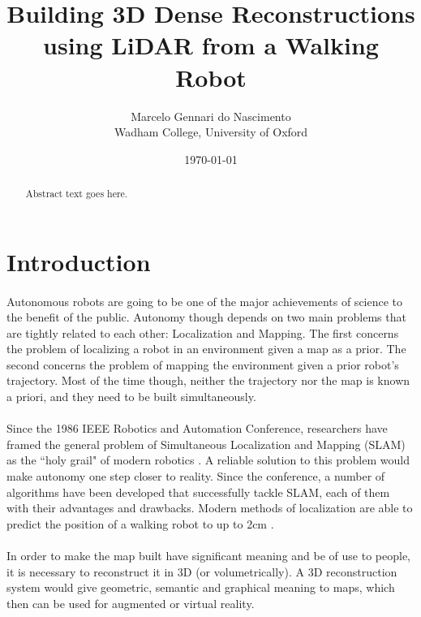 \documentclass[11pt]{article}
\title{Building 3D Dense Reconstructions using LiDAR from a Walking Robot}
\author{Marcelo Gennari do Nascimento \\ Wadham College, University of Oxford}
\date{\today}
\begin{document}

	\maketitle

	\newpage

	\begin{abstract}
		Abstract text goes here.
	\end{abstract}

	\newpage
	\tableofcontents

	\newpage
	\section{Introduction}
	\paragraph{}
	Autonomous robots are going to be one of the major achievements of science to the benefit of the public. Autonomy though depends on two main problems that are tightly related to each other: Localization and Mapping. The first concerns the problem of localizing a robot in an environment given a map as a prior. The second concerns the problem of mapping the environment given a prior robot's trajectory. Most of the time though, neither the trajectory nor the map is known a priori, and they need to be built simultaneously.
	
	\paragraph{}
	Since the 1986 IEEE Robotics and Automation Conference, researchers have framed the general problem of Simultaneous Localization and Mapping (SLAM) as the ``holy grail" of modern robotics \cite{SLAMPartI}. A reliable solution to this problem would make autonomy one step closer to reality. Since the conference, a number of algorithms have been developed that successfully tackle SLAM, each of them with their advantages and drawbacks. Modern methods of localization are able to predict the position of a walking robot to up to 2cm \cite{7041346}.
	
	\paragraph{}
	In order to make the map built have significant meaning and be of use to people, it is necessary to reconstruct it in 3D (or volumetrically). A 3D reconstruction system would give geometric, semantic and graphical meaning to maps, which then can be used for augmented or virtual reality.
	
\end{document}
